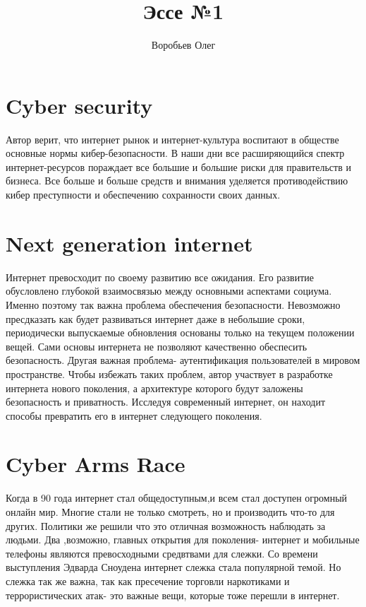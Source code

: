 \documentclass[10pt,a4paper,landscape]{article}
\author{Воробьев Олег}
\title{Эссе №1}
\begin{document}
\maketitle
\section{Cyber security}
Автор верит, что интернет рынок и интернет-культура воспитают в обществе основные нормы кибер-безопасности.
В наши дни все расширяющийся спектр интернет-ресурсов пораждает все большие и большие риски для правительств и бизнеса. 
Все больше и больше средств и внимания уделяется противодействию кибер преступности и обеспечению сохранности своих данных. 

\section{Next generation internet}
Интернет превосходит по своему развитию все ожидания. Его развитие обусловлено глубокой взаимосвязью между основными аспектами социума. Именно поэтому так важна проблема обеспечения безопасности.
Невозможно пресдказать как будет развиваться интернет даже в небольшие сроки, периодически выпускаемые обновления основаны только на текущем положении вещей. Сами основы интернета не позволяют качественно обеспесить безопасность. Другая важная проблема- аутентификация пользователей в мировом пространстве. Чтобы избежать таких проблем, автор участвует в разработке интернета нового поколения, а архитектуре которого будут заложены безопасность и приватность. Исследуя современный интернет, он находит способы превратить его в интернет следующего поколения.

\section{Cyber Arms Race}
Когда в 90 года интернет стал общедоступным,и всем стал доступен огромный онлайн мир. Многие стали не только смотреть, но и производить что-то для других. Политики же решили что это отличная возможность наблюдать за людьми. Два ,возможно, главных открытия для поколения- интернет и мобильные телефоны являются превосходными средвтвами для слежки. Со времени выступления Эдварда Сноудена интернет слежка стала популярной темой. Но слежка так же важна, так как пресечение торговли наркотиками и террористических атак- это важные вещи, которые тоже перешли в интернет. 
\end{document}
